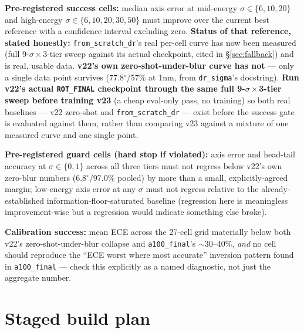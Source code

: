 \documentclass[11pt]{article}
\newcommand{\code}[1]{\texttt{#1}}
\begin{document}
\textbf{Pre-registered success cells:} median axis error at mid-energy
$\sigma\in\{6,10,20\}$ and high-energy $\sigma\in\{6,10,20,30,50\}$ must improve over the
current best reference with a confidence interval excluding zero. \textbf{Status of that
reference, stated honestly:} \code{from\_scratch\_dr}'s real per-cell curve has now been
measured (full 9-$\sigma\times$3-tier sweep against its actual checkpoint, cited in
\S\ref{sec:fallback}) and is real, usable data. \textbf{v22's own zero-shot-under-blur curve
has not} --- only a single data point survives (77.8$^\circ$/57\% at 1nm, from
\code{dr\_sigma}'s docstring). \textbf{Run v22's actual \code{ROT\_FINAL} checkpoint through
the same full 9-$\sigma\times$3-tier sweep before training v23} (a cheap eval-only pass, no
training) so both real baselines --- v22 zero-shot and \code{from\_scratch\_dr} --- exist
before the success gate is evaluated against them, rather than comparing v23 against a
mixture of one measured curve and one single point.

\textbf{Pre-registered guard cells (hard stop if violated):} axis error and head-tail
accuracy at $\sigma\in\{0,1\}$ across all three tiers must not regress below v22's own
zero-blur numbers (6.8$^\circ$/97.0\% pooled) by more than a small, explicitly-agreed margin;
low-energy axis error at any $\sigma$ must not regress relative to the already-established
information-floor-saturated baseline (regression here is meaningless improvement-wise but a
regression would indicate something else broke).

\textbf{Calibration success:} mean ECE across the 27-cell grid materially below both v22's
zero-shot-under-blur collapse and \code{a100\_final}'s $\sim$30--40\%, \emph{and} no cell
should reproduce the ``ECE worst where most accurate'' inversion pattern found in
\code{a100\_final} --- check this explicitly as a named diagnostic, not just the aggregate
number.

\section{Staged build plan}
\end{document}
